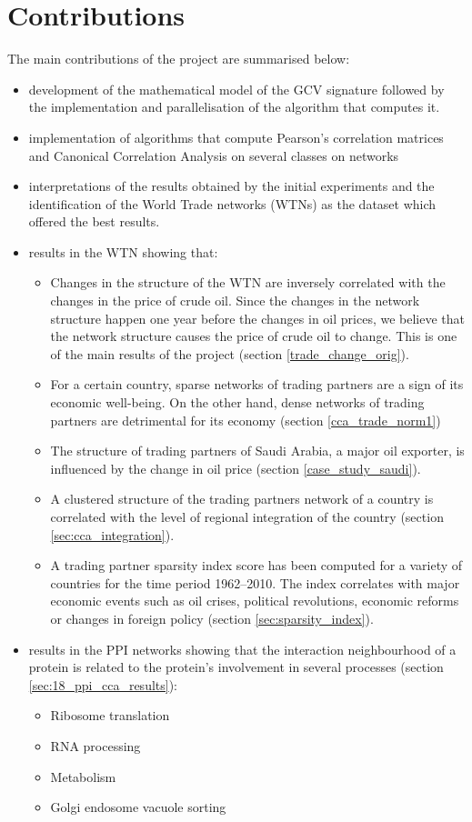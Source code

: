 \section{Contributions}

The main contributions of the project are summarised below:
\begin{itemize}
 \item development of the mathematical model of the GCV signature followed by the implementation and parallelisation of the algorithm that computes it.
 \item implementation of algorithms that compute Pearson's correlation matrices and Canonical Correlation Analysis on several classes on networks
 \item interpretations of the results obtained by the initial experiments and the identification of the World Trade networks (WTNs) as the dataset which offered the best results.
 \item results in the WTN showing that:
  \begin{itemize}
   \item Changes in the structure of the WTN are inversely correlated with the changes in the price of crude oil. Since the changes in the network structure happen one year before the changes in oil prices, we believe that the network structure causes the price of crude oil to change. This is one of the main results of the project (section \ref{trade_change_orig}).
   \item For a certain country, sparse networks of trading partners are a sign of its economic well-being. On the other hand, dense networks of trading partners are detrimental for its economy  (section \ref{cca_trade_norm1})
   \item The structure of trading partners of Saudi Arabia, a major oil exporter, is influenced by the change in oil price (section \ref{case_study_saudi}).
   \item A clustered structure of the trading partners network of a country is correlated with the level of regional integration of the country (section \ref{sec:cca_integration}).
   \item A trading partner sparsity index score has been computed for a variety of countries for the time period 1962--2010. The index correlates with major economic events such as oil crises, political revolutions, economic reforms or changes in foreign policy (section \ref{sec:sparsity_index}).
  \end{itemize}
 \item results in the PPI networks showing that the interaction neighbourhood of a protein is related to the protein's involvement in several processes (section \ref{sec:18_ppi_cca_results}):
  \begin{itemize}
   \item Ribosome translation
   \item RNA processing
   \item Metabolism
   \item Golgi endosome vacuole sorting
  \end{itemize}


\end{itemize}
